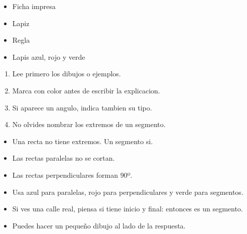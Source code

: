 \documentclass[12pt,a4paper]{article}
\begin{document}
        \FichaCabecera

        \begin{materialesbox}
        \begin{itemize}
    \item Ficha impresa
    \item Lapiz
    \item Regla
    \item Lapis azul, rojo y verde
\end{itemize}
        \end{materialesbox}

        \begin{pasosbox}
        \begin{enumerate}
    \item Lee primero los dibujos o ejemplos.
    \item Marca con color antes de escribir la explicacion.
    \item Si aparece un angulo, indica tambien su tipo.
    \item No olvides nombrar los extremos de un segmento.
\end{enumerate}
        \end{pasosbox}

        \begin{recordatoriobox}
        \begin{itemize}
    \item Una recta no tiene extremos. Un segmento si.
    \item Las rectas paralelas no se cortan.
    \item Las rectas perpendiculares forman 90º.
\end{itemize}
        \end{recordatoriobox}

        \begin{apoyobox}
        \begin{itemize}
    \item Usa azul para paralelas, rojo para perpendiculares y verde para segmentos.
    \item Si ves una calle real, piensa si tiene inicio y final: entonces es un segmento.
    \item Puedes hacer un pequeño dibujo al lado de la respuesta.
\end{itemize}
        \end{apoyobox}


\end{document}
